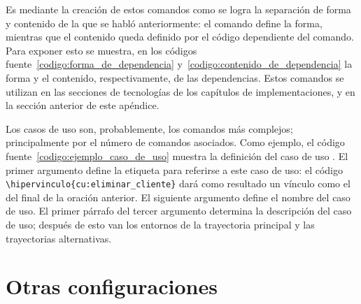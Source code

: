 
Es mediante la creación de estos comandos como se logra la separación de forma
y contenido de la que se habló anteriormente: el comando define la forma,
mientras que el contenido queda definido por el código dependiente del comando.
Para exponer esto se muestra, en los códigos
fuente~\ref{codigo:forma_de_dependencia} y~\ref{codigo:contenido_de_dependencia}
la forma y el contenido, respectivamente, de las dependencias. Estos comandos
se utilizan en las secciones de tecnologías de los capítulos de
implementaciones, y en la sección anterior de este apéndice.



Los casos de uso son, probablemente, los comandos más complejos; principalmente
por el número de comandos asociados. Como ejemplo, el código
fuente~\ref{codigo:ejemplo_caso_de_uso} muestra la definición del caso de uso
. El primer argumento define la etiqueta para
referirse a este caso de uso: el código
\verb|\hipervinculo{cu:eliminar_cliente}| dará como resultado un vínculo como
el del final de la oración anterior. El siguiente argumento define el nombre
del caso de uso. El primer párrafo del tercer argumento determina la
descripción del caso de uso; después de esto van los entornos de la trayectoria
principal y las trayectorias alternativas.


\section{Otras configuraciones}

